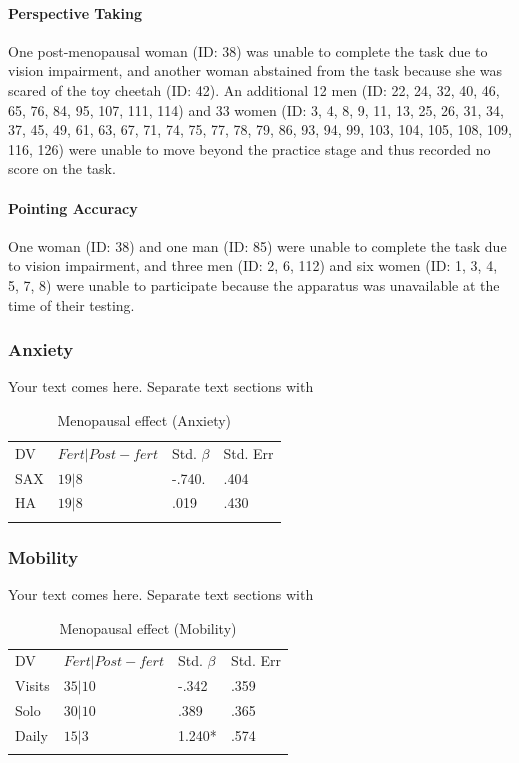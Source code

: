 \paragraph{Perspective Taking}
One post-menopausal woman (ID: 38) was unable to complete the task due to vision impairment, and another woman abstained from the task because she was scared of the toy cheetah (ID: 42).  An additional 12 men (ID: 22, 24, 32, 40, 46, 65, 76, 84, 95, 107, 111, 114) and 33 women (ID: 3, 4, 8, 9, 11, 13, 25, 26, 31, 34, 37, 45, 49, 61, 63, 67, 71, 74, 75, 77, 78, 79, 86, 93, 94, 99, 103, 104, 105, 108, 109, 116, 126) were unable to move beyond the practice stage and thus recorded no score on the task.

\paragraph{Pointing Accuracy}

One woman (ID: 38) and one man (ID: 85) were unable to complete the task due to vision impairment, and three men (ID: 2, 6, 112) and six women (ID: 1, 3, 4, 5, 7, 8) were unable to participate because the apparatus was unavailable at the time of their testing.

		\subsubsection{Anxiety}
		\label{sec:3.2.2}
Your text comes here. Separate text sections with	

\begin{table}
\caption{Menopausal effect (Anxiety)}
\label{tab:fert_anx}  
\begin{tabular}{llll}
\hline\noalign{\smallskip}
DV & $Fert|Post-fert$ & Std. $\beta$ & Std. Err  \\
\noalign{\smallskip}\hline\noalign{\smallskip}
SAX & $19|8$ & -.740. & .404 \\
HA & $19|8$ & .019 & .430 \\
\noalign{\smallskip}\hline
\end{tabular}
\end{table}

		\subsubsection{Mobility}
		\label{sec:3.2.3}
Your text comes here. Separate text sections with	

\begin{table}
\caption{Menopausal effect (Mobility)}
\label{tab:fert_mob}  
\begin{tabular}{llll}
\hline\noalign{\smallskip}
DV & $Fert|Post-fert$ & Std. $\beta$ & Std. Err  \\
\noalign{\smallskip}\hline\noalign{\smallskip}
Visits & $35|10$ & -.342 & .359 \\
Solo & $30|10$ & .389 & .365 \\
Daily & $15|3$ & 1.240* & .574 \\
\noalign{\smallskip}\hline
\end{tabular}
\end{table}

